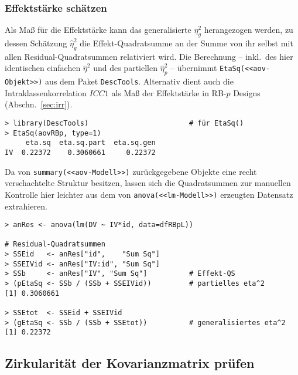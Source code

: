 \subsubsection{Effektstärke schätzen}

Als Maß für die Effektstärke kann das generalisierte $\eta_{g}^{2}$ herangezogen werden, zu dessen Schätzung $\hat{\eta}_{g}^{2}$ die Effekt-Quadratsumme an der Summe von ihr selbst mit allen Residual-Quadratsummen relativiert wird. Die Berechnung -- inkl.\ des hier identischen einfachen $\hat{\eta}^{2}$ und des partiellen $\hat{\eta}_{p}^{2}$ -- übernimmt \lstinline!EtaSq(<<aov-Objekt>>)! aus dem Paket \lstinline!DescTools!. Alternativ dient auch die Intraklassenkorrelation $ICC1$ als Maß der Effektstärke in RB-$p$ Designs (Abschn.\ \ref{sec:irr}).
\begin{lstlisting}
> library(DescTools)                        # für EtaSq()
> EtaSq(aovRBp, type=1)
     eta.sq  eta.sq.part  eta.sq.gen
IV  0.22372    0.3060661     0.22372
\end{lstlisting}

Da von \lstinline!summary(<<aov-Modell>>)! zurückgegebene Objekte eine recht verschachtelte Struktur besitzen, lassen sich die Quadratsummen zur manuellen Kontrolle hier leichter aus dem von \lstinline!anova(<<lm-Modell>>)! erzeugten Datensatz extrahieren.
\begin{lstlisting}
> anRes <- anova(lm(DV ~ IV*id, data=dfRBpL))

# Residual-Quadratsummen
> SSEid   <- anRes["id",    "Sum Sq"]
> SSEIVid <- anRes["IV:id", "Sum Sq"]
> SSb     <- anRes["IV", "Sum Sq"]          # Effekt-QS
> (pEtaSq <- SSb / (SSb + SSEIVid))         # partielles eta^2
[1] 0.3060661

> SSEtot  <- SSEid + SSEIVid
> (gEtaSq <- SSb / (SSb + SSEtot))          # generalisiertes eta^2
[1] 0.22372
\end{lstlisting}

\subsection{Zirkularität der Kovarianzmatrix prüfen}
\label{sec:sphericity}

